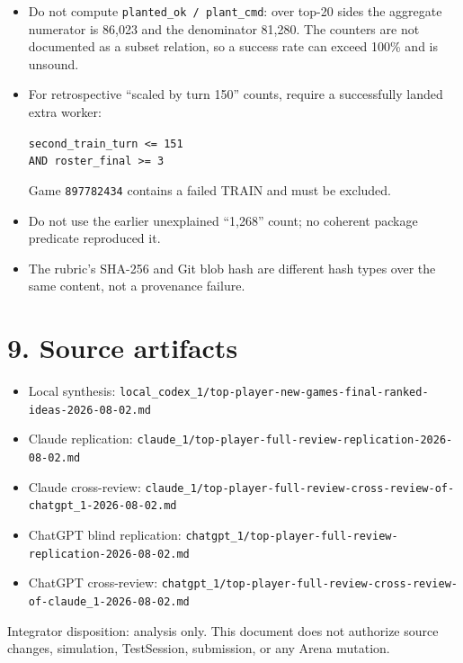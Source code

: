 \documentclass[10pt,a4paper]{article}
\begin{document}
\begin{itemize}
  \item Do not compute \texttt{planted\_ok / plant\_cmd}: over top-20 sides the aggregate
        numerator is 86,023 and the denominator 81,280. The counters are not documented as
        a subset relation, so a success rate can exceed 100\% and is unsound.
  \item For retrospective ``scaled by turn 150'' counts, require a successfully landed
        extra worker:
        \begin{center}\small
        \texttt{second\_train\_turn <= 151}\\[-1mm]
        \texttt{AND roster\_final >= 3}
        \end{center}
        Game \texttt{897782434} contains a failed TRAIN and must be excluded.
  \item Do not use the earlier unexplained ``1,268'' count; no coherent package predicate
        reproduced it.
  \item The rubric's SHA-256 and Git blob hash are different hash types over the same
        content, not a provenance failure.
\end{itemize}

\section*{9. Source artifacts}

\scriptsize
\sloppy
\begin{itemize}
  \item Local synthesis: \nolinkurl{local_codex_1/top-player-new-games-final-ranked-ideas-2026-08-02.md}
  \item Claude replication: \nolinkurl{claude_1/top-player-full-review-replication-2026-08-02.md}
  \item Claude cross-review: \nolinkurl{claude_1/top-player-full-review-cross-review-of-chatgpt_1-2026-08-02.md}
  \item ChatGPT blind replication: \nolinkurl{chatgpt_1/top-player-full-review-replication-2026-08-02.md}
  \item ChatGPT cross-review: \nolinkurl{chatgpt_1/top-player-full-review-cross-review-of-claude_1-2026-08-02.md}
\end{itemize}

\vfill
{\color{muted}\footnotesize Integrator disposition: analysis only. This document does not
authorize source changes, simulation, TestSession, submission, or any Arena mutation.}
\end{document}
